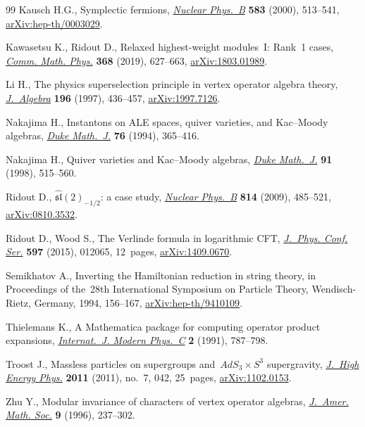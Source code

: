 \begin{thebibliography}{99}
Kausch H.G., Symplectic fermions,
 \href{https://doi.org/10.1016/S0550-3213(00)00295-9}{\textit{Nuclear
 Phys.~B}} \textbf{583} (2000), 513--541,
 \href{http://arxiv.org/abs/hep-th/0003029}{arXiv:hep-th/0003029}.

Kawasetsu K., Ridout D., Relaxed highest-weight modules~{I}: {R}ank~1 cases,
 \href{https://doi.org/10.1007/s00220-019-03305-x}{\textit{Comm. Math. Phys.}}
 \textbf{368} (2019), 627--663,
 \href{http://arxiv.org/abs/1803.01989}{arXiv:1803.01989}.

Li H., The physics superselection principle in vertex operator algebra theory,
 \href{https://doi.org/10.1006/jabr.1997.7126}{\textit{J.~Algebra}}
 \textbf{196} (1997), 436--457,
 \href{http://arxiv.org/abs/1997.7126}{arXiv:1997.7126}.

Nakajima H., Instantons on {ALE} spaces, quiver varieties, and {K}ac--{M}oody
 algebras, \href{https://doi.org/10.1215/S0012-7094-94-07613-8}{\textit{Duke
 Math.~J.}} \textbf{76} (1994), 365--416.

Nakajima H., Quiver varieties and {K}ac--{M}oody algebras,
 \href{https://doi.org/10.1215/S0012-7094-98-09120-7}{\textit{Duke Math.~J.}}
 \textbf{91} (1998), 515--560.

Ridout D., {$\widehat{\mathfrak{sl}}(2)_{-1/2}$}: a case study,
 \href{https://doi.org/10.1016/j.nuclphysb.2009.01.008}{\textit{Nuclear
 Phys.~B}} \textbf{814} (2009), 485--521,
 \href{http://arxiv.org/abs/0810.3532}{arXiv:0810.3532}.

Ridout D., Wood S., The {V}erlinde formula in logarithmic {CFT},
 \href{https://doi.org/10.1088/1742-6596/597/1/012065}{\textit{J.~Phys. Conf.
 Ser.}} \textbf{597} (2015), 012065, 12~pages,
 \href{http://arxiv.org/abs/1409.0670}{arXiv:1409.0670}.

Semikhatov A., Inverting the {H}amiltonian reduction in string theory, in
 Proceedings of the~28th {I}nternational {S}ymposium on {P}article {T}heory,
 Wendisch-Rietz, Germany, 1994, 156--167,
 \href{http://arxiv.org/abs/hep-th/9410109}{arXiv:hep-th/9410109}.

Thielemans K., A {M}athematica package for computing operator product
 expansions,
 \href{https://doi.org/10.1142/S0129183191001001}{\textit{Internat.~J. Modern
 Phys.~C}} \textbf{2} (1991), 787--798.

Troost J., Massless particles on supergroups and~{$AdS_3\times S^3$}
 supergravity, \href{https://doi.org/10.1007/JHEP07(2011)042}{\textit{J.~High
 Energy Phys.}} \textbf{2011} (2011), no.~7, 042, 25~pages,
 \href{http://arxiv.org/abs/1102.0153}{arXiv:1102.0153}.

Zhu Y., Modular invariance of characters of vertex operator algebras,
 \href{https://doi.org/10.1090/S0894-0347-96-00182-8}{\textit{J.~Amer. Math.
 Soc.}} \textbf{9} (1996), 237--302.

\end{thebibliography}
